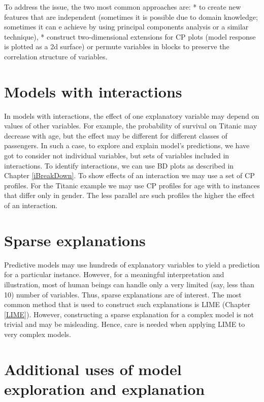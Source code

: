 \documentclass[]{krantz}
\begin{document}
To address the issue, the two most common approaches are:
* to create new features that are independent (sometimes it is possible due to domain knowledge; sometimes it can e achieve by using principal components analysis or a similar technique),
* construct two-dimensional extensions for CP plots (model response is plotted as a 2d surface) or permute variables in blocks to preserve the correlation structure of variables.

\hypertarget{models-with-interactions}{%
\section{Models with interactions}\label{models-with-interactions}}

In models with interactions, the effect of one explanatory variable may depend on values of other variables. For example, the probability of survival on Titanic may decrease with age, but the effect may be different for different classes of passengers.
In such a case, to explore and explain model's predictions, we have got to consider not individual variables, but sets of variables included in interactions. To identify interactions, we can use BD plots as described in Chapter \ref{iBreakDown}. To show effects of an interaction we may use a set of CP profiles. For the Titanic example we may use CP profiles for age with to instances that differ only in gender. The less parallel are such profiles the higher the effect of an interaction.

\hypertarget{sparse-explanations}{%
\section{Sparse explanations}\label{sparse-explanations}}

Predictive models may use hundreds of explanatory variables to yield a prediction for a particular instance. However, for a meaningful interpretation and illustration, most of human beings can handle only a very limited (say, less than 10) number of variables. Thus, sparse explanations are of interest. The most common method that is used to construct such explanations is LIME (Chapter \ref{LIME}). However, constructing a sparse explanation for a complex model is not trivial and may be misleading. Hence, care is needed when applying LIME to very complex models.

\hypertarget{additional-uses-of-model-exploration-and-explanation}{%
\section{Additional uses of model exploration and explanation}\label{additional-uses-of-model-exploration-and-explanation}}
\end{document}
